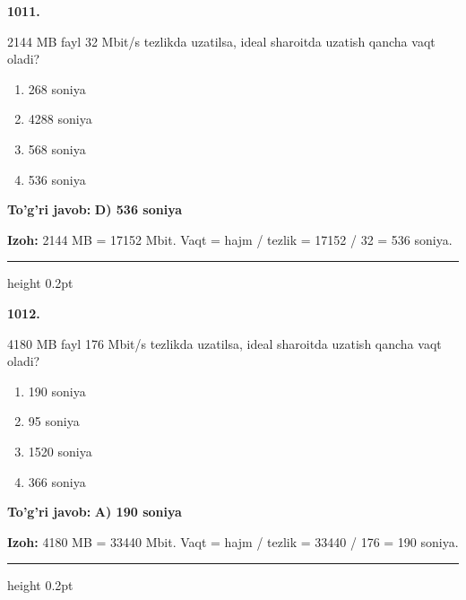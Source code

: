 \documentclass[10pt,a4paper,oneside]{article}
\begin{document}
\noindent\textbf{\color{ink}1011.}
\par
2144 MB fayl 32 Mbit/s tezlikda uzatilsa, ideal sharoitda uzatish qancha vaqt oladi?
\begin{enumerate}[label=\Alph*),leftmargin=9mm]
\item 268 soniya
\item 4288 soniya
\item 568 soniya
\item 536 soniya
\end{enumerate}
\begin{tcolorbox}[enhanced,breakable,colback=teal!4,colframe=teal!50!black,boxrule=0.5pt,arc=1.1mm,left=3mm,right=3mm,top=1.7mm,bottom=1.7mm,before skip=2mm,after skip=2mm]
\textbf{\color{teal}To'g'ri javob:} \textbf{D) 536 soniya}
\par\smallskip
\textbf{Izoh:} 2144 MB = 17152 Mbit. Vaqt = hajm / tezlik = 17152 / 32 = 536 soniya.
\end{tcolorbox}
\vspace{2mm}\hrule height 0.2pt \vspace{3mm}

\noindent\textbf{\color{ink}1012.}
\par
4180 MB fayl 176 Mbit/s tezlikda uzatilsa, ideal sharoitda uzatish qancha vaqt oladi?
\begin{enumerate}[label=\Alph*),leftmargin=9mm]
\item 190 soniya
\item 95 soniya
\item 1520 soniya
\item 366 soniya
\end{enumerate}
\begin{tcolorbox}[enhanced,breakable,colback=teal!4,colframe=teal!50!black,boxrule=0.5pt,arc=1.1mm,left=3mm,right=3mm,top=1.7mm,bottom=1.7mm,before skip=2mm,after skip=2mm]
\textbf{\color{teal}To'g'ri javob:} \textbf{A) 190 soniya}
\par\smallskip
\textbf{Izoh:} 4180 MB = 33440 Mbit. Vaqt = hajm / tezlik = 33440 / 176 = 190 soniya.
\end{tcolorbox}
\vspace{2mm}\hrule height 0.2pt \vspace{3mm}
\end{document}
